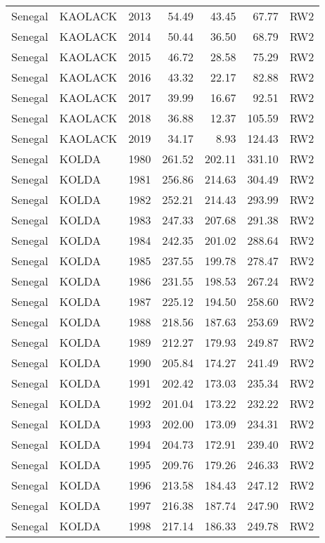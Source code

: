 \begin{longtable}{lllrrrl}
  Senegal & KAOLACK & 2013 & 54.49 & 43.45 & 67.77 & RW2 \\ 
  Senegal & KAOLACK & 2014 & 50.44 & 36.50 & 68.79 & RW2 \\ 
  Senegal & KAOLACK & 2015 & 46.72 & 28.58 & 75.29 & RW2 \\ 
  Senegal & KAOLACK & 2016 & 43.32 & 22.17 & 82.88 & RW2 \\ 
  Senegal & KAOLACK & 2017 & 39.99 & 16.67 & 92.51 & RW2 \\ 
  Senegal & KAOLACK & 2018 & 36.88 & 12.37 & 105.59 & RW2 \\ 
  Senegal & KAOLACK & 2019 & 34.17 & 8.93 & 124.43 & RW2 \\ 
  Senegal & KOLDA & 1980 & 261.52 & 202.11 & 331.10 & RW2 \\ 
  Senegal & KOLDA & 1981 & 256.86 & 214.63 & 304.49 & RW2 \\ 
  Senegal & KOLDA & 1982 & 252.21 & 214.43 & 293.99 & RW2 \\ 
  Senegal & KOLDA & 1983 & 247.33 & 207.68 & 291.38 & RW2 \\ 
  Senegal & KOLDA & 1984 & 242.35 & 201.02 & 288.64 & RW2 \\ 
  Senegal & KOLDA & 1985 & 237.55 & 199.78 & 278.47 & RW2 \\ 
  Senegal & KOLDA & 1986 & 231.55 & 198.53 & 267.24 & RW2 \\ 
  Senegal & KOLDA & 1987 & 225.12 & 194.50 & 258.60 & RW2 \\ 
  Senegal & KOLDA & 1988 & 218.56 & 187.63 & 253.69 & RW2 \\ 
  Senegal & KOLDA & 1989 & 212.27 & 179.93 & 249.87 & RW2 \\ 
  Senegal & KOLDA & 1990 & 205.84 & 174.27 & 241.49 & RW2 \\ 
  Senegal & KOLDA & 1991 & 202.42 & 173.03 & 235.34 & RW2 \\ 
  Senegal & KOLDA & 1992 & 201.04 & 173.22 & 232.22 & RW2 \\ 
  Senegal & KOLDA & 1993 & 202.00 & 173.09 & 234.31 & RW2 \\ 
  Senegal & KOLDA & 1994 & 204.73 & 172.91 & 239.40 & RW2 \\ 
  Senegal & KOLDA & 1995 & 209.76 & 179.26 & 246.33 & RW2 \\ 
  Senegal & KOLDA & 1996 & 213.58 & 184.43 & 247.12 & RW2 \\ 
  Senegal & KOLDA & 1997 & 216.38 & 187.74 & 247.90 & RW2 \\ 
  Senegal & KOLDA & 1998 & 217.14 & 186.33 & 249.78 & RW2 \\ 

\end{longtable}
